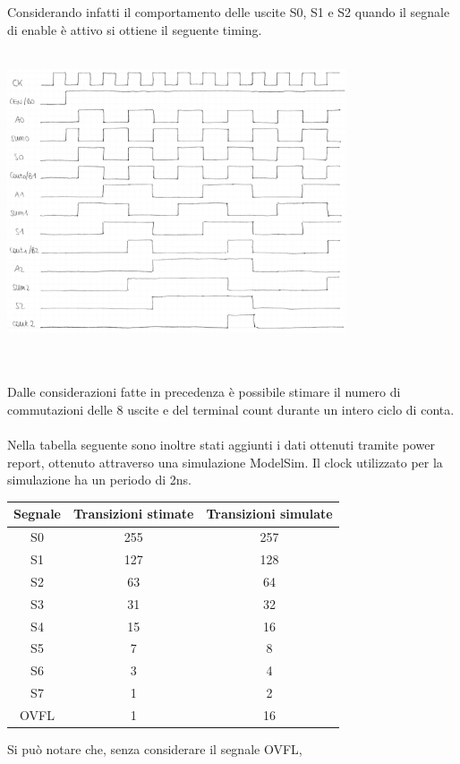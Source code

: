 \documentclass[11pt,  english, makeidx, a4paper, titlepage, oneside]{book}
\begin{document}
Considerando infatti il comportamento delle uscite S0, S1 e S2 quando il segnale di 
enable è attivo si ottiene il seguente timing.
\\\\
\centerline{\includegraphics[width=10cm]{./img/Lab_1/Es_5/Contatore.png}}
\\\\
Dalle considerazioni fatte in precedenza è possibile stimare il numero
di commutazioni delle 8 uscite e del terminal count durante 
un intero ciclo di conta.
\\\\Nella tabella seguente sono inoltre stati
aggiunti i dati ottenuti tramite power report, ottenuto attraverso 
una simulazione ModelSim. Il clock utilizzato per la simulazione ha un periodo
di 2ns.
\\
\begin{center}
	\begin{tabular}{|c|c|c|}
	\hline
	Segnale & Transizioni stimate & Transizioni simulate \\ 
	\hline
	S0 & 255 & 257 \\
	\hline
	S1 & 127 & 128\\
	\hline
	S2 & 63 & 64\\
	\hline
	S3 & 31 & 32\\
	\hline
	S4 & 15 & 16 \\
	\hline
	S5 & 7 & 8 \\
	\hline
	S6 & 3 & 4 \\
	\hline
	S7 & 1 & 2 \\
	\hline
	OVFL & 1 & 16 \\
	\hline
	\end{tabular}
\end{center}
\vspace{0.3cm}
Si può notare che, senza considerare il segnale OVFL,
\end{document}
